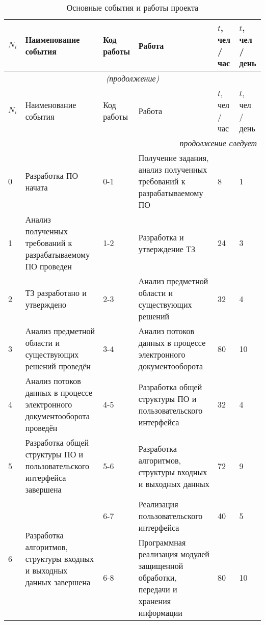 \begin{center}
\begin{longtable}[h]{| m{1cm} | m{4cm} | m{1.5cm} | m{5cm} | m{1cm} | m{1cm} |}
	\caption{Основные события и работы проекта} \label{table:events} \tabularnewline
  \hline


\rowcolor{Gray} \centering  $N_i$  &  \centering Наименование события & \centering Код работы & \centering  Работа &  \centering $t$, чел / час &  \centering $t$,  чел / день \tabularnewline \hline \endfirsthead   \hline
 \multicolumn{6}{|c|}{\small\slshape (продолжение)}        \tabularnewline \hline
 \rowcolor{Gray}  \centering $N_i$  &  \centering Наименование события & \centering  Код работы & \centering   Работа &  \centering$t$, чел / час &  \centering$t$,  чел / день               \tabularnewline \hline
                                              \endhead        \hline
 \multicolumn{6}{|r|}{\small\slshape продолжение следует}  \tabularnewline \hline
                                              \endfoot        \hline
                                              \endlastfoot



 0 & Разработка ПО начата & 0-1 & Получение задания, анализ полученных требований к разрабатываемому ПО & 8 & 1 \tabularnewline \hline

 1 & Анализ полученных требований к разрабатываемому ПО проведен & 1-2 & Разработка и утверждение ТЗ & 24 & 3 \tabularnewline \hline
 
 2 & ТЗ разработано и утверждено & 2-3 & Анализ предметной области и существующих решений & 32 & 4 \tabularnewline \hline
 
 3 & Анализ предметной области и существующих решений проведён & 3-4 & Анализ потоков данных в процессе электронного документооборота & 80 & 10 \tabularnewline \hline
 
 4 & Анализ потоков данных в процессе электронного документооборота проведён & 4-5 & Разработка общей структуры ПО и пользовательского интерфейса & 32 & 4 \tabularnewline \hline
 
 5 & Разработка общей структуры ПО и пользовательского интерфейса завершена & 5-6 & Разработка алгоритмов, структуры входных и выходных данных & 72 & 9 \tabularnewline \hline
 
 \multirow{2}{1cm}{6} & \multirow{2}{4cm}{Разработка алгоритмов, структуры входных и выходных данных завершена} & 6-7 & Реализация пользовательского интерфейса & 40 & 5 \tabularnewline \cline{3-6} 
 & & 6-8 & Программная реализация модулей защищенной обработки, передачи и хранения информации & 80 & 10 \tabularnewline \hline


\end{longtable}
\end{center}
